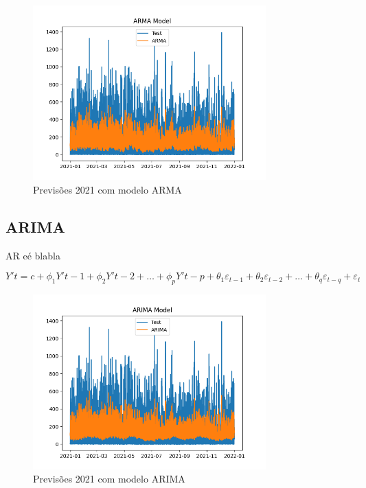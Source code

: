 \begin{figure}[H]
    \centering
    \includegraphics[width=0.8\textwidth]{../plots/ARMA_model.png}
    \caption{Previsões 2021 com modelo ARMA}
    \label{fig:ARMA_model}
\end{figure}

\subsection{ARIMA}

AR eé blabla

\begin{equation} \label{eq:ARIMA} Y't = c + \phi_1 Y'{t-1} + \phi_2 Y'{t-2} + \dots + \phi_p Y'{t-p} + \theta_1 \varepsilon_{t-1} + \theta_2 \varepsilon_{t-2} + \dots + \theta_q \varepsilon_{t-q} + \varepsilon_t \end{equation}

\begin{figure}[H]
    \centering
    \includegraphics[width=0.8\textwidth]{../plots/ARIMA_model.png}
    \caption{Previsões 2021 com modelo ARIMA}
    \label{fig:ARIMA_model}
\end{figure}

